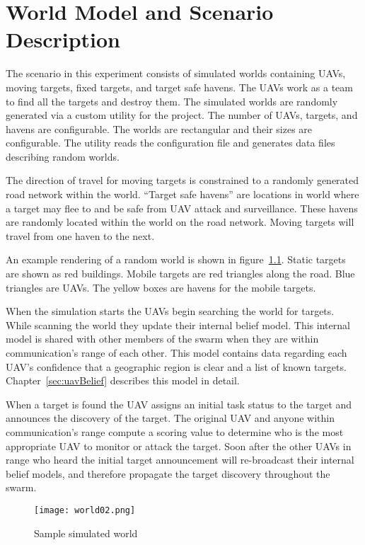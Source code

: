 \chapter{World Model and Scenario Description}

The scenario in this experiment consists of simulated worlds containing UAVs, moving targets, fixed targets, and target safe havens.  The UAVs work as a team to find all the targets and destroy them.  The simulated worlds are randomly generated via a custom utility for the project.  The number of UAVs, targets, and havens are configurable.  The worlds are rectangular and their sizes are configurable.  The utility reads the configuration file and generates data files describing random worlds.  


The direction of travel for moving targets is constrained to a randomly generated road network within the world.  ``Target safe havens'' are locations in world where a target may flee to and be safe from UAV attack and surveillance.  These havens are randomly located within the world on the road network.  Moving targets will travel from one haven to the next.

An example rendering of a random world is shown in figure~\ref{fig:sample_world}. Static targets are shown as red buildings.  Mobile targets are red triangles along the road.  Blue triangles are UAVs.  The yellow boxes are havens for the mobile targets.

When the simulation starts the UAVs begin searching the world for targets.  While scanning the world they update their internal belief model.  This internal model is shared with other members of the swarm when they are within communication's range of each other.  This model contains data regarding each UAV's confidence that a geographic region is clear and a list of known targets.  Chapter~\ref{sec:uavBelief} describes this model in detail.

When a target is found the UAV assigns an initial task status to the target and announces the discovery of the target.  The original UAV and anyone within communication's range compute a scoring value to determine who is the most appropriate UAV to monitor or attack the target.  Soon after the other UAVs in range who heard the initial target announcement will re-broadcast their internal belief models, and therefore propagate the target discovery throughout the swarm.


\begin{figure}[H]
	\centering
	\texttt{[image: world02.png]}
	\caption{Sample simulated world}
	\label{fig:sample_world}
\end{figure}

